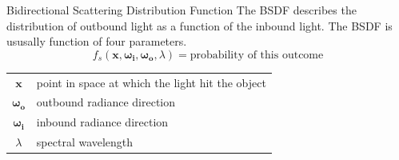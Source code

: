 \documentclass[10pt]{beamer}
\DeclarePairedDelimiter\ip{\langle }{\rangle}
\begin{document}
\begin{frame}{Bidirectional Scattering Distribution Function}
  The BSDF describes the distribution of outbound light as a function of the inbound light.
  The BSDF is ususally function of four parameters.
  \[f_s(\mathbf x, \bm{\omega_i}, \bm{\omega_o}, \lambda) = \text{probability of this outcome}\]

  \hrulefill

  \begin{center}
    \begin{tabu}{cl}
      \(\mathbf x\) & point in space at which the light hit the object\\
      \(\bm{\omega_o}\) & outbound radiance direction\\
      \(\bm{\omega_i}\) & inbound radiance direction\\
      \(\lambda\) & spectral wavelength\\
    \end{tabu}
  \end{center}
\end{frame}

\end{document}
